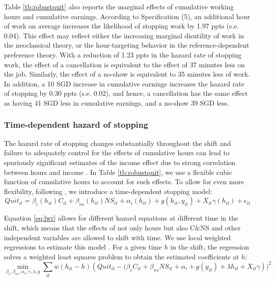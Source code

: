 \documentclass[reviewmode,AEJ]{AEA}
\begin{document}
Table \ref{tb:robustquit} also reports the marginal effects of cumulative working hours and cumulative earnings. According to Specification (5), an additional hour of work on average increases the likelihood of stopping work by 1.97 ppts (s.e. 0.04). This effect may reflect either the increasing marginal disutility of work in the neoclassical theory, or the hour-targeting behavior in the reference-dependent preference theory. With a reduction of 1.23 ppts in the hazard rate of stopping work, the effect of a cancellation is equivalent to the effect of 37 minutes less on the job. Similarly, the effect of a no-show is equivalent to 35 minutes less of work. In addition, a 10 SGD increase in cumulative earnings increases the hazard rate of stopping by 0.30 ppts (s.e. 0.02), and hence, a cancellation has the same effect as having 41 SGD less in cumulative earnings, and a no-show 39 SGD less.

\subsubsection{Time-dependent hazard of stopping}
The hazard rate of stopping changes substantially throughout the shift and failure to adequately control for the effects of cumulative hours can lead to spuriously significant estimates of the income effect due to strong correlation between hours and income \citep{thakral2018daily}. In Table \ref{tb:robustquit}, we use a flexible cubic function of cumulative hours to account for such effects. To allow for even more flexibility, following \cite{thakral2018daily}, we introduce a time-dependent stopping model:
\begin{equation}
\label{eq:lwr}
    Quit_{it} = \beta_c(h_{it})C_{it} + \beta_{ns}(h_{it}){NS}_{it} + \alpha_i(h_{it}) + g(h_{it}, y_{it}) + X_{it}\gamma(h_{it}) + \epsilon_{it}
\end{equation}

Equation \eqref{eq:lwr} allows for different hazard equations at different time in the shift, which means that the effects of not only hours but also C\&NS and other independent variables are allowed to shift with time. We use local weighted regressions to estimate this model \citep{cleveland1988locally}. For a given time $h$ in the shift, the regression solves a weighted least squares problem to obtain the estimated coefficients at $h$:
\[\min_{\beta_c, \beta_{ns}, \alpha_i, \gamma, \lambda, g} \sum_{it} w(h_{it}-h) \left(Quit_{it} - (\beta_cC_{it} + \beta_{ns}{NS}_{it} + \alpha_i + g(y_{it}) + \lambda h_{it} + X_{it}\gamma\right))^2\]
\end{document}
